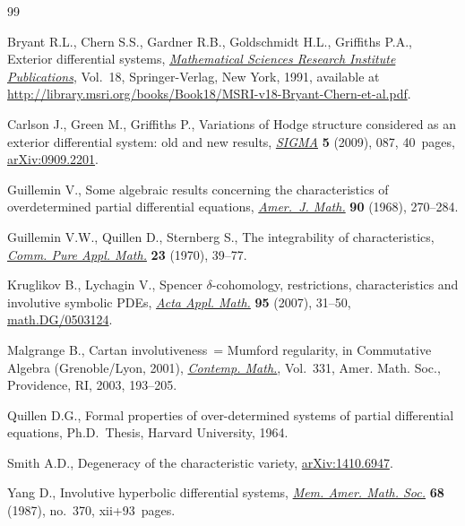\documentclass[pdftex]{sigma}
\numberwithin{equation}{section}
\begin{document}
\begin{thebibliography}{99}
\footnotesize \itemsep=0pt

Bryant R.L., Chern S.S., Gardner R.B., Goldschmidt H.L., Grif\/f\/iths P.A.,
  Exterior dif\/ferential systems, \href{http://dx.doi.org/10.1007/978-1-4613-9714-4}{\textit{Mathematical Sciences Research
  Institute Publications}}, Vol.~18, Springer-Verlag, New York, 1991, available at
\url{http://library.msri.org/books/Book18/MSRI-v18-Bryant-Chern-et-al.pdf}.

Carlson J., Green M., Grif\/f\/iths P., Variations of {H}odge structure considered
  as an exterior dif\/ferential system: old and new results, \href{http://dx.doi.org/10.3842/SIGMA.2009.087}{\textit{SIGMA}}
  \textbf{5} (2009), 087, 40~pages, \href{http://arxiv.org/abs/0909.2201}{arXiv:0909.2201}.

Guillemin V., Some algebraic results concerning the characteristics of
  overdetermined partial dif\/ferential equations, \href{http://dx.doi.org/10.2307/2373436}{\textit{Amer.~J. Math.}}
  \textbf{90} (1968), 270--284.

Guillemin V.W., Quillen D., Sternberg S., The integrability of characteristics,
  \href{http://dx.doi.org/10.1002/cpa.3160230103}{\textit{Comm. Pure Appl. Math.}} \textbf{23} (1970), 39--77.

Kruglikov B., Lychagin V., Spencer {$\delta$}-cohomology, restrictions,
  characteristics and involutive symbolic {PDE}s, \href{http://dx.doi.org/10.1007/s10440-006-9080-z}{\textit{Acta Appl. Math.}}
  \textbf{95} (2007), 31--50, \href{http://arxiv.org/abs/math.DG/0503124}{math.DG/0503124}.

Malgrange B., Cartan involutiveness~= {M}umford regularity, in Commutative
  Algebra ({G}renoble/{L}yon, 2001), \href{http://dx.doi.org/10.1090/conm/331/05911}{\textit{Contemp. Math.}}, Vol.~331, Amer.
  Math. Soc., Providence, RI, 2003, 193--205.

Quillen D.G., Formal properties of over-determined systems of partial
  dif\/ferential equations, Ph.D.~Thesis, Harvard University, 1964.

Smith A.D., Degeneracy of the characteristic variety, \href{http://arxiv.org/abs/1410.6947}{arXiv:1410.6947}.

Yang D., Involutive hyperbolic dif\/ferential systems, \href{http://dx.doi.org/10.1090/memo/0370}{\textit{Mem. Amer. Math.
  Soc.}} \textbf{68} (1987), no.~370, xii+93~pages.

\end{thebibliography}\LastPageEnding
\end{document}
